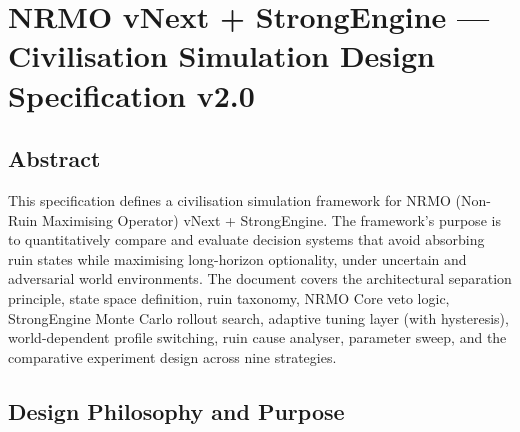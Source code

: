 
\chapter{NRMO vNext + StrongEngine ---
Civilisation Simulation Design Specification v2.0}
\label{ch:vnext-simulator}



\section*{Abstract}

This specification defines a civilisation simulation framework for
NRMO (Non-Ruin Maximising Operator) vNext + StrongEngine. The
framework's purpose is to quantitatively compare and evaluate
decision systems that avoid absorbing ruin states while maximising
long-horizon optionality, under uncertain and adversarial world
environments. The document covers the architectural separation
principle, state space definition, ruin taxonomy, NRMO Core veto
logic, StrongEngine Monte Carlo rollout search, adaptive tuning
layer (with hysteresis), world-dependent profile switching, ruin
cause analyser, parameter sweep, and the comparative experiment
design across nine strategies.

\section{Design Philosophy and Purpose}
\label{sec:vnext-philosophy}

